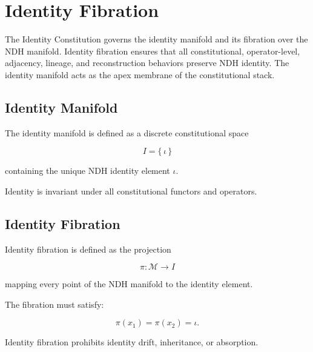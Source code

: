 
\section{Identity Fibration}
\label{sec:identity-fibration}

The Identity Constitution governs the identity manifold and its fibration
over the NDH manifold. Identity fibration ensures that all constitutional,
operator-level, adjacency, lineage, and reconstruction behaviors preserve
NDH identity. The identity manifold acts as the apex membrane of the
constitutional stack.


\subsection{Identity Manifold}

The identity manifold is defined as a discrete constitutional space

\[
I = \{\,\iota\,\}
\]

containing the unique NDH identity element $\iota$.

Identity is invariant under all constitutional functors and operators.


\subsection{Identity Fibration}

Identity fibration is defined as the projection

\[
\pi : \mathcal{M} \to I
\]

mapping every point of the NDH manifold to the identity element.

The fibration must satisfy:

\[
\pi(x_1) = \pi(x_2) = \iota.
\]

Identity fibration prohibits identity drift, inheritance, or absorption.

